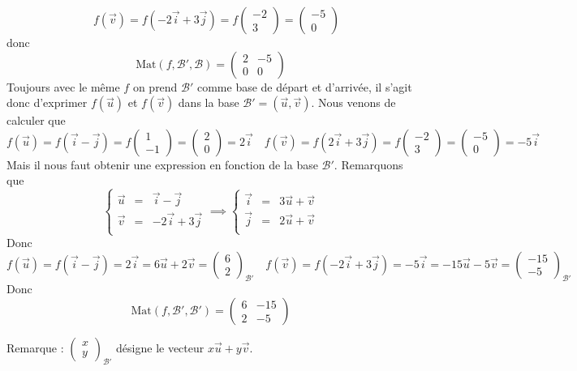 {{$$\quad 
f(\vec{v})=f(-2\vec{i}+3\vec{j})=f\begin{pmatrix}-2\\3\end{pmatrix} = \begin{pmatrix}-5\\0\end{pmatrix}$$
donc
$$\textrm{Mat}(f,\mathcal{B}',\mathcal{B}) = \begin{pmatrix} 2 & -5 \\ 0 & 0 \end{pmatrix}$$
Toujours avec le même $f$ on prend $\mathcal{B}'$ comme base de départ et d'arrivée,
il s'agit donc d'exprimer $f(\vec{u})$ et $f(\vec{v})$ dans la base $\mathcal{B}'=(\vec{u},\vec{v})$.
Nous venons de calculer que 
$$f(\vec{u})=f(\vec{i}- \vec{j})=f\begin{pmatrix}1\\-1\end{pmatrix} = \begin{pmatrix}2\\0\end{pmatrix}=2\vec{i}
\quad 
f(\vec{v})=f(2\vec{i}+3\vec{j})=f\begin{pmatrix}-2\\3\end{pmatrix} = \begin{pmatrix}-5\\0\end{pmatrix}=-5\vec{i}$$
Mais il  nous faut obtenir une expression en fonction de la base $\mathcal{B}'$.
Remarquons que 
$$\left\{\begin{array}{lcr}
\vec{u} &=& \vec{i}-\vec{j} \\
\vec{v} &=& -2\vec{i}+3\vec{j} \\           
         \end{array}\right.
\implies
\left\{\begin{array}{lcr}
\vec{i} &=& 3\vec{u}+\vec{v} \\
\vec{j} &=& 2\vec{u}+\vec{v} \\           
         \end{array}\right.$$
Donc 
$$f(\vec{u})=f(\vec{i}- \vec{j})=2\vec{i}=6\vec{u}+2\vec{v} = \begin{pmatrix}6\\2\end{pmatrix}_{\mathcal{B}'}
\quad
f(\vec{v})=f(-2\vec{i}+3\vec{j})=-5\vec{i}=-15\vec{u}-5\vec{v} = \begin{pmatrix}-15\\-5\end{pmatrix}_{\mathcal{B}'}$$
Donc
$$\textrm{Mat}(f,\mathcal{B}',\mathcal{B}') = \begin{pmatrix} 6 & -15 \\ 2 & -5 \end{pmatrix}$$

Remarque :
$\begin{pmatrix}x\\y\end{pmatrix}_{\mathcal{B}'}$
désigne le vecteur $x \vec{u}+y\vec{v}$.
}
}
